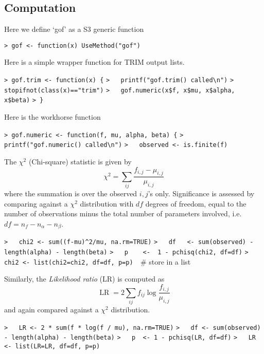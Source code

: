 \documentclass[a4paper]{article}
\begin{document}
\subsection{Computation}\par

Here we define `gof' as a S3 generic function\par
\verb~> gof <- function(x) UseMethod("gof")~\par

Here is a simple wrapper function for TRIM output lists.\par
\verb~> gof.trim <- function(x) {~\newline
\verb~>   printf("gof.trim() called\n")~\newline
\verb~>   stopifnot(class(x)=="trim")~\newline
\verb~>   gof.numeric(x$f, x$mu, x$alpha, x$beta)~\newline
\verb~> }~\par

Here is the workhorse function\par

\verb~> gof.numeric <- function(f, mu, alpha, beta) {~\newline
\verb~>   printf("gof.numeric() called\n")~\newline
\verb~>   observed <- is.finite(f)~\par

The $\chi^2$ (Chi-square) statistic is given by
\begin{equation}
  \chi^2 = \sum_{ij}\frac{f_{i,j}-\mu_{i,j}}{\mu_{i,j}}
\end{equation}
where the summation is over the observed $i,j$'s only.
Significance is assessed by comparing against a $\chi^2$ distribution with
$df$ degrees of freedom, equal to the number of observations
minus the total number of parameters involved, i.e.\
$df = n_f - n_\alpha - n_\beta$.\par
\verb~>   chi2 <- sum((f-mu)^2/mu, na.rm=TRUE)~\newline
\verb~>   df   <- sum(observed) - length(alpha) - length(beta)~\newline
\verb~>   p    <-  1 - pchisq(chi2, df=df)~\newline
\verb~>   chi2 <- list(chi2=chi2, df=df, p=p)  ~{\sffamily\# store in a list}\par

Similarly, the \emph{Likelihood ratio} (LR) is computed as
\begin{equation}
  \operatorname{LR} = 2\sum_{ij}f_{ij} \log\frac{f_{i,j}}{\mu_{i,j}} \label{LR}
\end{equation}
and again compared against a $\chi^2$ distribution.\par
\verb~>   LR <- 2 * sum(f * log(f / mu), na.rm=TRUE)~\newline
\verb~>   df <- sum(observed) - length(alpha) - length(beta)~\newline
\verb~>   p  <- 1 - pchisq(LR, df=df)~\newline
\verb~>   LR <- list(LR=LR, df=df, p=p)~\par
\end{document}

